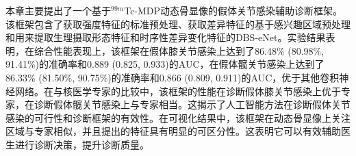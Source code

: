 本章主要提出了一个基于\(^{99m}\)Tc-MDP动态骨显像的假体关节感染辅助诊断框架。该框架包含了获取强度特征的标准预处理、获取差异特征的基于感兴趣区域预处理和用来提取生理摄取形态特征和时序性差异变化特征的DBS-eNet。实验结果表明，在综合性能表现上，该框架在假体膝关节感染上达到了86.48\% (80.98\%, 91.41\%)的准确率和0.889 (0.825, 0.933)的AUC，在假体髋关节感染上达到了86.33\% (81.50\%, 90.75\%)的准确率和0.866 (0.809, 0.911)的AUC，优于其他卷积神经网络。在与核医学专家的比较中，该框架的性能在诊断假体膝关节感染上优于专家，在诊断假体髋关节感染上与专家相当。这揭示了人工智能方法在诊断假体关节感染的可行性和诊断框架的有效性。在可视化结果中，该框架在动态骨显像上关注区域与专家相似，并且提出的特征具有明显的可区分性。这表明它可以有效辅助医生进行诊断决策，提升诊断质量。